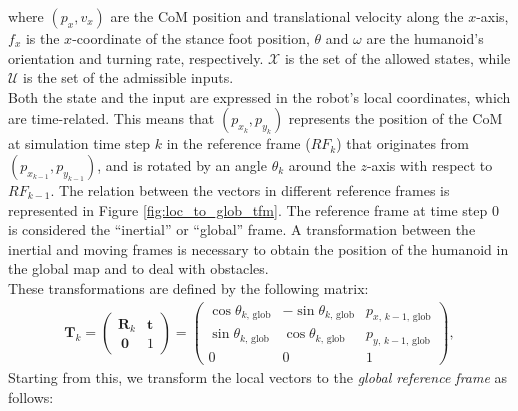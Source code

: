 where $(p_x, v_x)$ are the CoM position and translational velocity along the $x$-axis, $f_x$ is the $x$-coordinate of the stance foot position, $\theta$ and $\omega$ are the humanoid's orientation and turning rate, respectively. $\mathcal{X}$ is the set of the allowed states, while $\mathcal{U}$ is the set of the admissible inputs.\\
Both the state and the input are expressed in the robot's local coordinates, which are time-related. This means that $(p_{x_k}, p_{y_k})$ represents the position of the CoM at simulation time step $k$ in the reference frame ($RF_k$) that originates from $(p_{x_{k-1}}, p_{y_{k-1}})$, and is rotated by an angle $\theta_k$ around the $z$-axis with respect to $RF_{k-1}$. The relation between the vectors in different reference frames is represented in Figure \ref{fig:loc_to_glob_tfm}.
The reference frame at time step 0 is considered the ``inertial'' or ``global'' frame. A transformation between the inertial and moving frames is necessary to obtain the position of the humanoid in the global map and to deal with obstacles.\\
These transformations are defined by the following matrix:
\begin{align}
    \mathbf{T}_k = 
    \begin{pmatrix}
        \mathbf{R}_k & \mathbf{t} \\[1ex]
        \ \mathbf{0} & 1
    \end{pmatrix}
    =
    \begin{pmatrix}
        \cos\theta_{k,\, \text{glob}} & -\sin\theta_{k,\, \text{glob}} & p_{x,\,k-1,\,\text{glob}} \\
        \sin\theta_{k,\, \text{glob}} & \cos\theta_{k,\, \text{glob}} &  p_{y,\,k-1,\,\text{glob}} \\
        0 & 0 & 1
    \end{pmatrix},
\end{align}
Starting from this, we transform the local vectors to the \textit{global reference frame} as follows:
